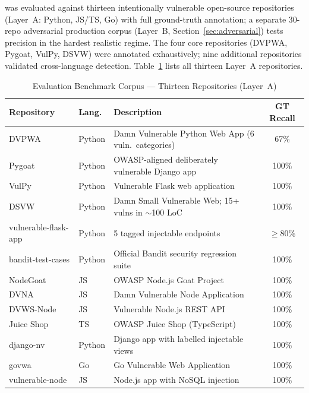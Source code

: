 \ACRQA{} was evaluated against thirteen intentionally vulnerable open-source repositories (Layer~A: Python, JS/TS, Go) with full ground-truth annotation; a separate 30-repo adversarial production corpus (Layer~B, Section~\ref{sec:adversarial}) tests precision in the hardest realistic regime. The four core repositories (DVPWA, Pygoat, VulPy, DSVW) were annotated exhaustively; nine additional repositories validated cross-language detection. Table~\ref{tab:benchmark_repos} lists all thirteen Layer~A repositories.

\begin{table}[htbp]
\caption{Evaluation Benchmark Corpus --- Thirteen Repositories (Layer~A)}
\label{tab:benchmark_repos}
\centering
\small
\renewcommand{\arraystretch}{1.25}
\begin{tabularx}{\textwidth}{@{} l l X c @{}}
\toprule
\textbf{Repository} & \textbf{Lang.} & \textbf{Description} & \textbf{GT Recall} \\
\midrule
DVPWA \cite{dvwa}            & Python & Damn Vulnerable Python Web App (6 vuln.\ categories) & 67\% \\
Pygoat \cite{pygoat_app}     & Python & OWASP-aligned deliberately vulnerable Django app & 100\% \\
VulPy                        & Python & Vulnerable Flask web application & 100\% \\
DSVW                         & Python & Damn Small Vulnerable Web; 15+ vulns in $\sim$100 LoC & 100\% \\
vulnerable-flask-app         & Python & 5 tagged injectable endpoints & $\geq$80\% \\
bandit-test-cases \cite{bandit_tool} & Python & Official Bandit security regression suite & 100\% \\
NodeGoat \cite{nodegoat_app} & JS     & OWASP Node.js Goat Project & 100\% \\
DVNA                         & JS     & Damn Vulnerable Node Application & 100\% \\
DVWS-Node                    & JS     & Vulnerable Node.js REST API & 100\% \\
Juice Shop \cite{juiceshop_app} & TS  & OWASP Juice Shop (TypeScript) & 100\% \\
django-nv                        & Python & Django app with labelled injectable views & 100\% \\
govwa                            & Go     & Go Vulnerable Web Application & 100\% \\
vulnerable-node                  & JS     & Node.js app with NoSQL injection & 100\% \\
\bottomrule
\end{tabularx}
\end{table}

